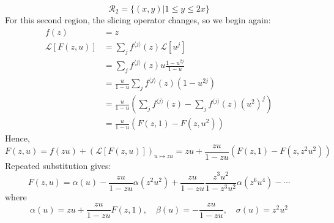 \begin{equation*}
    \mathcal{R}_{2} = \{(x, y)|1 \leq y \leq 2x\}
\end{equation*}
For this second region, the slicing operator changes, so we begin again:
\begin{equation*}
    \begin{aligned}
        f(z) &= z \\
        \mathcal{L}[F(z, u)]
            &= \sum_{j} f^{\langle j \rangle}(z)\mathcal{L}[u^{j}] \\
            &= \sum_{j} f^{\langle j \rangle}(z)u \frac{1 - u^{2j}}{1 - u} \\
            &= \frac{u}{1 - u} \sum_{j} f^{\langle j \rangle}(z)(1 - u^{2j}) \\
            &= \frac{u}{1 - u} \left(\sum_{j} f^{\langle j \rangle}(z) - \sum_{j} f^{\langle j \rangle}(z)(u^{2})^{j}\right) \\
            &= \frac{u}{1 - u} \left(F(z, 1) - F(z, u^{2})\right)
    \end{aligned}
\end{equation*}
Hence,
\begin{equation} \label{eq:III.22.5}
    F(z, u) = f(zu) + (\mathcal{L}[F(z, u)])_{u \mapsto zu} = zu + \frac{zu}{1 - zu} \left(F(z, 1) - F(z, z^{2}u^{2})\right)
\end{equation}
Repeated substitution gives:
\begin{equation*}
    F(z, u) = \alpha(u) - \frac{zu}{1 - zu} \alpha(z^{2}u^{2}) + \frac{zu}{1 - zu} \frac{z^{3}u^{2}}{1 - z^{3}u^{2}}\alpha(z^{6}u^{4}) - \cdots
\end{equation*}
where
\begin{equation*}
    \alpha(u) = zu + \frac{zu}{1 - zu} F(z, 1), \quad \beta(u) = -\frac{zu}{1 - zu}, \quad \sigma(u) = z^{2}u^{2}
\end{equation*}

